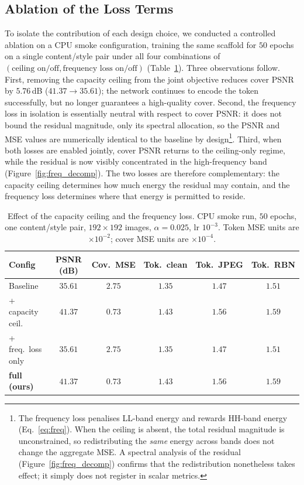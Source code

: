 \documentclass[runningheads]{llncs}
\begin{document}
\subsection{Ablation of the Loss Terms}
\label{sec:ablation}
To isolate the contribution of each design choice, we conducted a controlled ablation on a CPU smoke configuration, training the same scaffold for $50$ epochs on a single content/style pair under all four combinations of $(\text{ceiling on/off}, \text{frequency loss on/off})$ (Table~\ref{tab:ablation}). Three observations follow. First, removing the capacity ceiling from the joint objective reduces cover PSNR by $5.76$\,dB ($41.37\to35.61$); the network continues to encode the token successfully, but no longer guarantees a high-quality cover. Second, the frequency loss in isolation is essentially neutral with respect to cover PSNR: it does not bound the residual magnitude, only its spectral allocation, so the PSNR and MSE values are numerically identical to the baseline by design\footnote{The frequency loss penalises LL-band energy and rewards HH-band energy (Eq.~\ref{eq:freq}). When the ceiling is absent, the total residual magnitude is unconstrained, so redistributing the \emph{same} energy across bands does not change the aggregate MSE. A spectral analysis of the residual (Figure~\ref{fig:freq_decomp}) confirms that the redistribution nonetheless takes effect; it simply does not register in scalar metrics.}. Third, when both losses are enabled jointly, cover PSNR returns to the ceiling-only regime, while the residual is now visibly concentrated in the high-frequency band (Figure~\ref{fig:freq_decomp}). The two losses are therefore complementary: the capacity ceiling determines how much energy the residual may contain, and the frequency loss determines where that energy is permitted to reside.

\begin{table}[t]
\centering
\caption{Effect of the capacity ceiling and the frequency loss. CPU smoke run, $50$ epochs, one content/style pair, $192\!\times\!192$ images, $\alpha=0.025$, lr $10^{-3}$. Token MSE units are $\times10^{-2}$; cover MSE units are $\times10^{-4}$.}
\label{tab:ablation}
\setlength{\tabcolsep}{8pt}
\small
\begin{tabular}{lccccc}
\toprule
\textbf{Config} & \textbf{PSNR (dB)} & \textbf{Cov.\ MSE} & \textbf{Tok.\ clean} & \textbf{Tok.\ JPEG} & \textbf{Tok.\ RBN} \\
\midrule
Baseline             & $35.61$  & $2.75$ & $1.35$ & $1.47$ & $1.51$ \\
\rowcolor{rowshade}
+ capacity ceil.     & $41.37$  & $0.73$ & $1.43$ & $1.56$ & $1.59$ \\
+ freq.\ loss only   & $35.61$  & $2.75$ & $1.35$ & $1.47$ & $1.51$ \\
\rowcolor{rowshade}
\textbf{full (ours)} & $\mathbf{41.37}$ & $\mathbf{0.73}$ & $1.43$ & $1.56$ & $1.59$ \\
\bottomrule
\end{tabular}
\end{table}
\end{document}
